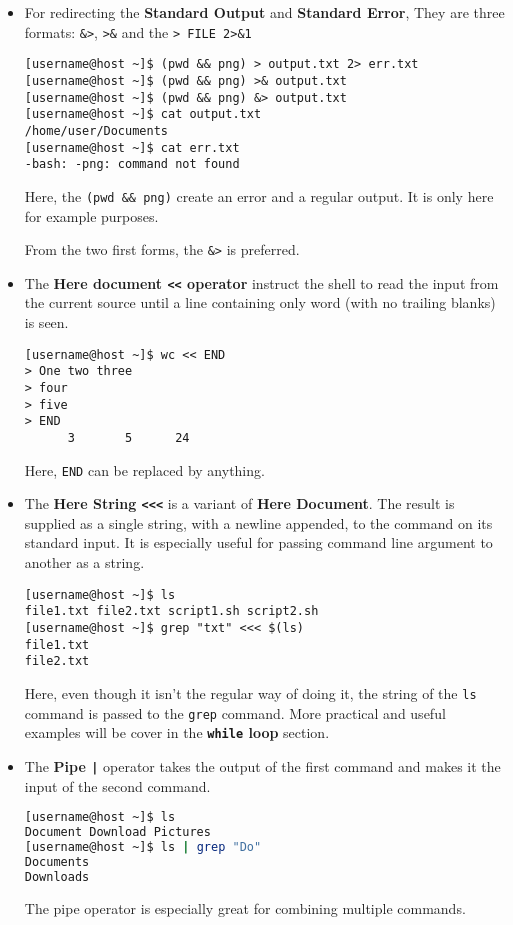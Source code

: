 \documentclass{article}
\newcommand{\inlinecode}[1]{\colorbox{backcolour}{\footnotesize{\texttt{#1}}}}
\begin{document}
\begin{itemize}
	\item For redirecting the \textbf{Standard Output} and \textbf{Standard Error}, They are three formats: \inlinecode{\&>}, \inlinecode{>\&} and the \inlinecode{> FILE 2>\&1}

	      \begin{lstlisting}[style=terminal]
[username@host ~]$ (pwd && png) > output.txt 2> err.txt
[username@host ~]$ (pwd && png) >& output.txt
[username@host ~]$ (pwd && png) &> output.txt
[username@host ~]$ cat output.txt
/home/user/Documents
[username@host ~]$ cat err.txt
-bash: -png: command not found
\end{lstlisting}

	      Here, the \inlinecode{(pwd \&\& png)} create an error and a regular output. It is only here for example purposes.

	      From the two first forms, the \inlinecode{\&>} is preferred.

	\item The \textbf{Here document \inlinecode{<<} operator} instruct the shell to read the  input from the current source until a line containing only word (with no trailing blanks) is seen.

	      \begin{lstlisting}[style=terminal]
[username@host ~]$ wc << END
> One two three
> four
> five
> END
      3       5      24
\end{lstlisting}

	      Here, \inlinecode{END} can be replaced by anything.

	\item The \textbf{Here String \inlinecode{<<<}} is a variant of \textbf{Here Document}. The result is supplied as a single string, with a newline appended, to the command on its standard input.  It is especially useful for passing command line argument to another as a string.

	      \begin{lstlisting}[style=terminal]
[username@host ~]$ ls
file1.txt file2.txt script1.sh script2.sh
[username@host ~]$ grep "txt" <<< $(ls)
file1.txt
file2.txt
\end{lstlisting}

	      Here, even though it isn't the regular way of doing it, the string of the \inlinecode{ls} command is passed to the \inlinecode{grep} command.
	      More practical and useful examples will be cover in the \textbf{\inlinecode{while} loop} section.

	\item The \textbf{Pipe \inlinecode{|}} operator takes the output of the first command and makes it the input of the second command.
	      \begin{lstlisting}[style=terminal, language=bash]
[username@host ~]$ ls
Document Download Pictures
[username@host ~]$ ls | grep "Do"
Documents
Downloads
\end{lstlisting}

	      The pipe operator is especially great for combining multiple commands.
\end{itemize}
\end{document}
